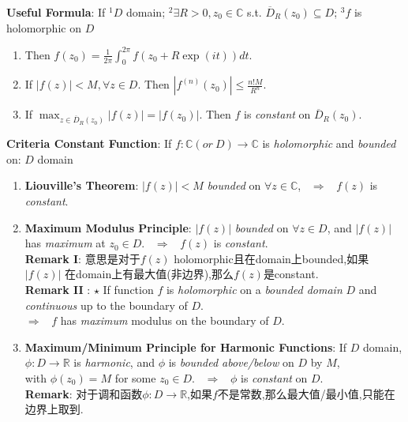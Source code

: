 \documentclass[9pt]{article}
\begin{document}
\textbf{Useful Formula}: If $^1D$ domain; $^2\exists R>0,z_0\in\mathbb{C}$ s.t. $\overline{D}_{R}(z_0)\subseteq D$; $^3f$ is holomorphic on $D$

\begin{enumerate}[itemsep=-2pt, topsep=-2pt]
    \item Then $f(z_0)=\frac{1}{2\pi}\int_0^{2\pi}f(z_0+R\exp(it))dt$.
    \item If $|f(z)|<M,\forall z\in D$. Then $|f^{(n)}(z_0)|\leq\frac{n!M}{R^n}$.
    \item If $\max_{{z\in}\overline{D}_{R}(z_0)}|f(z)|=|f(z_0)|$. Then $f$ is \textit{constant} on $\overline{D}_{R}(z_0)$.
\end{enumerate}

\textbf{Criteria Constant Function}: If $f:\mathbb{C}(or \ D)\to\mathbb{C}$ is \textit{holomorphic} and \textit{bounded} on: \qquad\qquad $D$ domain

\begin{enumerate}[itemsep=-2pt, topsep=-2pt]
    \item \textbf{Liouville's Theorem}: $|f(z)|<M$ \textit{bounded} on $\forall z \in \mathbb{C}$, \ $\Rightarrow$ \ $f(z)$ is \textit{constant}. 
    \item \textbf{Maximum Modulus Principle}: $|f(z)|$ \textit{bounded} on $\forall z \in D$, and $|f(z)|$ has \textit{maximum} at $z_0\in D$. \ $\Rightarrow$ \ $f(z)$ is \textit{constant}. \\
    \textbf{Remark I}: {\footnotesize 意思是对于$f(z)$ holomorphic且在domain上bounded,如果 $|f(z)|$ 在domain上有最大值(非边界),那么$f(z)$是constant.} \\
    \textbf{Remark II} : $\star$ If function $f$ is \textit{holomorphic} on a \textit{bounded domain} $D$ and \textit{continuous} up to the boundary of $D$. \\
    $\Rightarrow$ \ $f$ has \textit{maximum} modulus on the boundary of $D$. 
    \item {\small \textbf{Maximum/Minimum Principle for Harmonic Functions}: If $D$ domain, $\phi:D\to\mathbb{R}$ is \textit{harmonic}, and $\phi$ is \textit{bounded above/below} on $D$ by $M$,} \\
    {\small with $\phi(z_0)=M$ for some $z_0\in D$.} \ $\Rightarrow$ \ $\phi$ is \textit{constant} on $D$. \\
    \textbf{Remark}: {\footnotesize 对于调和函数$\phi:D\to\mathbb{R}$,如果$f$不是常数,那么最大值/最小值,只能在边界上取到.}
\end{enumerate}
\end{document}

